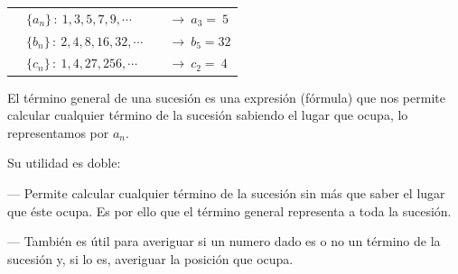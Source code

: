 \begin{miejemplo}


\begin{table}[H]
\begin{tabular}{llll}
 & $\{a_n\}	\, :\ 1,3,5,7,9, \cdots$ &  & $\to \ a_3=\ 5$ \\
 & $\{b_n\}	\, :\ 2,4,8,16,32, \cdots$ &  & $\to \ b_5=32$ \\
 & $\{c_n\}	\, :\ 1,4,27,256, \cdots$ &  & $\to \ c_2=\ 4 $
\end{tabular}
\end{table}
\end{miejemplo}

\begin{definition}

El término general de una sucesión es una expresión (fórmula) que nos permite calcular cualquier término de la sucesión sabiendo el lugar que ocupa, lo representamos por $a_n$.	

\vspace{2mm} Su utilidad es doble:

--- Permite calcular cualquier término de la sucesión sin más que saber el lugar que éste ocupa. Es por ello que el término general representa a toda la sucesión.

--- También es útil para averiguar si un numero dado es o no un término de la sucesión y, si lo es, averiguar la posición que ocupa.
\end{definition}

